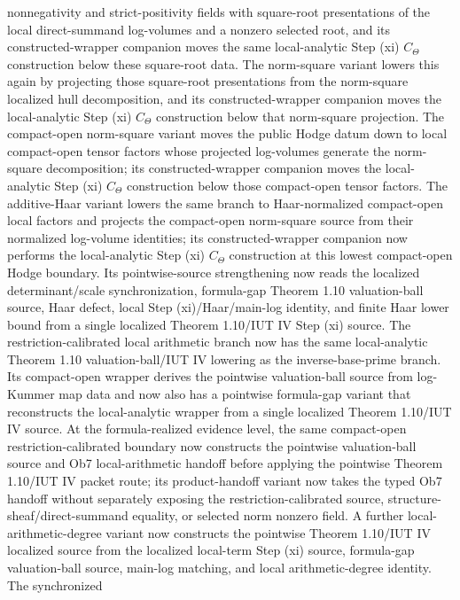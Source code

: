 \documentclass[11pt]{article}
\theoremstyle{plain}
\theoremstyle{definition}
\theoremstyle{remark}
\begin{document}
nonnegativity and strict-positivity fields with square-root presentations of
the local direct-summand log-volumes and a nonzero selected root, and its
constructed-wrapper companion moves the same local-analytic Step (xi)
\(C_{\Theta}\) construction below these square-root data.  The
norm-square variant lowers this again by projecting those square-root
presentations from the norm-square localized hull decomposition, and its
constructed-wrapper companion moves the local-analytic Step (xi)
\(C_{\Theta}\) construction below that norm-square projection.  The
compact-open norm-square variant moves the public Hodge datum down to local
compact-open tensor factors whose projected log-volumes generate the
norm-square decomposition; its constructed-wrapper companion moves the
local-analytic Step (xi) \(C_{\Theta}\) construction below those compact-open
tensor factors.  The additive-Haar variant lowers the same branch to
Haar-normalized compact-open local factors and projects the compact-open
norm-square source from their normalized log-volume identities; its
constructed-wrapper companion now performs the local-analytic Step (xi)
\(C_{\Theta}\) construction at this lowest compact-open Hodge boundary.  Its
pointwise-source strengthening now reads the localized determinant/scale
synchronization, formula-gap Theorem 1.10 valuation-ball source, Haar defect,
local Step (xi)/Haar/main-log identity, and finite Haar lower bound from a
single localized Theorem 1.10/IUT IV Step (xi) source.  The
restriction-calibrated local arithmetic branch now has the same local-analytic
Theorem 1.10 valuation-ball/IUT IV lowering as the inverse-base-prime branch.
Its compact-open wrapper derives the pointwise valuation-ball source from
log-Kummer map data and now also has a pointwise formula-gap variant that
reconstructs the local-analytic wrapper from a single localized Theorem
1.10/IUT IV source.  At the formula-realized evidence level, the same
compact-open restriction-calibrated boundary now constructs the pointwise
valuation-ball source and Ob7 local-arithmetic handoff before applying the
pointwise Theorem 1.10/IUT IV packet route; its product-handoff variant now
takes the typed Ob7 handoff without separately exposing the
restriction-calibrated source, structure-sheaf/direct-summand equality, or
selected norm nonzero field.  A further local-arithmetic-degree variant now
constructs the pointwise Theorem 1.10/IUT IV localized source from the
localized local-term Step (xi) source, formula-gap valuation-ball source,
main-log matching, and local arithmetic-degree identity.  The synchronized
\end{document}
